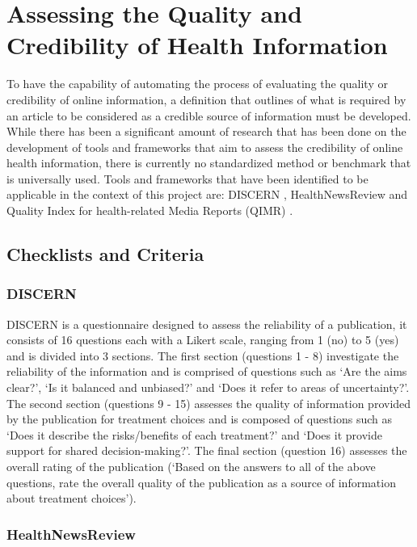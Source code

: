 \documentclass[a4paper,twoside,phd]{BYUPhys}
\begin{document}
\section{Assessing the Quality and Credibility of Health Information}
\label{sec:AssessingInformation}

To have the capability of automating the process of evaluating the quality or credibility of online information, a definition that outlines of what is required by an article to be considered as a credible source of information must be developed. While there has been a significant amount of research that has been done on the development of tools and frameworks that aim to assess the credibility of online health information, there is currently no standardized method or benchmark that is universally used. Tools and frameworks that have been identified to be applicable in the context of this project are: DISCERN \cite{DISCERN}, HealthNewsReview \cite{HealthNewsReview} and Quality Index for health-related Media Reports (QIMR) \cite{QIMR}.

\subsection{Checklists and Criteria}
\label{sec:Checklists}

\subsubsection{DISCERN}
\label{sec:DISCERN}

DISCERN \cite{DISCERN} is a questionnaire designed to assess the reliability of a publication, it consists of 16 questions each with a Likert scale, ranging from 1 (no) to 5 (yes) and is divided into 3 sections. The first section (questions 1 - 8) investigate the reliability of the information and is comprised of questions such as `Are the aims clear?', `Is it balanced and unbiased?' and `Does it refer to areas of uncertainty?'. The second section (questions 9 - 15) assesses the quality of information provided by the publication for treatment choices and is composed of questions such as `Does it describe the risks/benefits of each treatment?' and `Does it provide support for shared decision-making?'. The final section (question 16) assesses the overall rating of the publication (`Based on the answers to all of the above questions, rate the overall quality of the publication as a source of information about treatment choices').


\subsubsection{HealthNewsReview}
\label{sec:HealthNewsReview}
\end{document}
